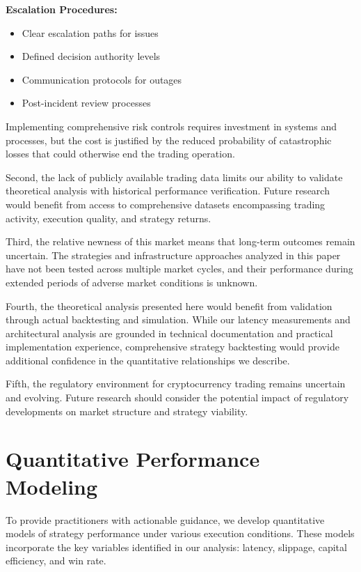\documentclass[12pt,a4paper]{article}
\begin{document}
\textbf{Escalation Procedures:}
\begin{itemize}
\item Clear escalation paths for issues
\item Defined decision authority levels
\item Communication protocols for outages
\item Post-incident review processes
\end{itemize}

Implementing comprehensive risk controls requires investment in systems and processes, but the cost is justified by the reduced probability of catastrophic losses that could otherwise end the trading operation.

Second, the lack of publicly available trading data limits our ability to validate theoretical analysis with historical performance verification. Future research would benefit from access to comprehensive datasets encompassing trading activity, execution quality, and strategy returns.

Third, the relative newness of this market means that long-term outcomes remain uncertain. The strategies and infrastructure approaches analyzed in this paper have not been tested across multiple market cycles, and their performance during extended periods of adverse market conditions is unknown.

Fourth, the theoretical analysis presented here would benefit from validation through actual backtesting and simulation. While our latency measurements and architectural analysis are grounded in technical documentation and practical implementation experience, comprehensive strategy backtesting would provide additional confidence in the quantitative relationships we describe.

Fifth, the regulatory environment for cryptocurrency trading remains uncertain and evolving. Future research should consider the potential impact of regulatory developments on market structure and strategy viability.

\section{Quantitative Performance Modeling}

To provide practitioners with actionable guidance, we develop quantitative models of strategy performance under various execution conditions. These models incorporate the key variables identified in our analysis: latency, slippage, capital efficiency, and win rate.
\end{document}
